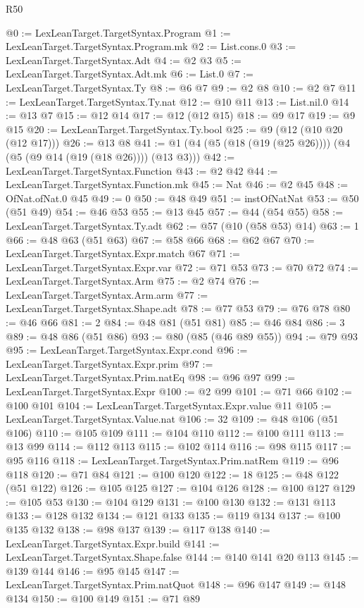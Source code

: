 \begin{lexlean}{R50}
\begin{coremodule}
@0 := LexLeanTarget.TargetSyntax.Program
@1 := LexLeanTarget.TargetSyntax.Program.mk
@2 := List.cons.{0}
@3 := LexLeanTarget.TargetSyntax.Adt
@4 := @2 @3
@5 := LexLeanTarget.TargetSyntax.Adt.mk
@6 := List.{0}
@7 := LexLeanTarget.TargetSyntax.Ty
@8 := @6 @7
@9 := @2 @8
@10 := @2 @7
@11 := LexLeanTarget.TargetSyntax.Ty.nat
@12 := @10 @11
@13 := List.nil.{0}
@14 := @13 @7
@15 := @12 @14
@17 := @12 (@12 @15)
@18 := @9 @17
@19 := @9 @15
@20 := LexLeanTarget.TargetSyntax.Ty.bool
@25 := @9 (@12 (@10 @20 (@12 @17)))
@26 := @13 @8
@41 := @1 (@4 (@5 (@18 (@19 (@25 @26)))) (@4 (@5 (@9 @14 (@19 (@18 @26)))) (@13 @3)))
@42 := LexLeanTarget.TargetSyntax.Function
@43 := @2 @42
@44 := LexLeanTarget.TargetSyntax.Function.mk
@45 := Nat
@46 := @2 @45
@48 := OfNat.ofNat.{0} @45
@49 := 0
@50 := @48 @49
@51 := instOfNatNat
@53 := @50 (@51 @49)
@54 := @46 @53
@55 := @13 @45
@57 := @44 (@54 @55)
@58 := LexLeanTarget.TargetSyntax.Ty.adt
@62 := @57 (@10 (@58 @53) @14)
@63 := 1
@66 := @48 @63 (@51 @63)
@67 := @58 @66
@68 := @62 @67
@70 := LexLeanTarget.TargetSyntax.Expr.match @67
@71 := LexLeanTarget.TargetSyntax.Expr.var
@72 := @71 @53
@73 := @70 @72
@74 := LexLeanTarget.TargetSyntax.Arm
@75 := @2 @74
@76 := LexLeanTarget.TargetSyntax.Arm.arm
@77 := LexLeanTarget.TargetSyntax.Shape.adt
@78 := @77 @53
@79 := @76 @78
@80 := @46 @66
@81 := 2
@84 := @48 @81 (@51 @81)
@85 := @46 @84
@86 := 3
@89 := @48 @86 (@51 @86)
@93 := @80 (@85 (@46 @89 @55))
@94 := @79 @93
@95 := LexLeanTarget.TargetSyntax.Expr.cond
@96 := LexLeanTarget.TargetSyntax.Expr.prim
@97 := LexLeanTarget.TargetSyntax.Prim.natEq
@98 := @96 @97
@99 := LexLeanTarget.TargetSyntax.Expr
@100 := @2 @99
@101 := @71 @66
@102 := @100 @101
@104 := LexLeanTarget.TargetSyntax.Expr.value @11
@105 := LexLeanTarget.TargetSyntax.Value.nat
@106 := 32
@109 := @48 @106 (@51 @106)
@110 := @105 @109
@111 := @104 @110
@112 := @100 @111
@113 := @13 @99
@114 := @112 @113
@115 := @102 @114
@116 := @98 @115
@117 := @95 @116
@118 := LexLeanTarget.TargetSyntax.Prim.natRem
@119 := @96 @118
@120 := @71 @84
@121 := @100 @120
@122 := 18
@125 := @48 @122 (@51 @122)
@126 := @105 @125
@127 := @104 @126
@128 := @100 @127
@129 := @105 @53
@130 := @104 @129
@131 := @100 @130
@132 := @131 @113
@133 := @128 @132
@134 := @121 @133
@135 := @119 @134
@137 := @100 @135 @132
@138 := @98 @137
@139 := @117 @138
@140 := LexLeanTarget.TargetSyntax.Expr.build
@141 := LexLeanTarget.TargetSyntax.Shape.false
@144 := @140 @141 @20 @113
@145 := @139 @144
@146 := @95 @145
@147 := LexLeanTarget.TargetSyntax.Prim.natQuot
@148 := @96 @147
@149 := @148 @134
@150 := @100 @149
@151 := @71 @89

\end{coremodule}
\end{lexlean}
